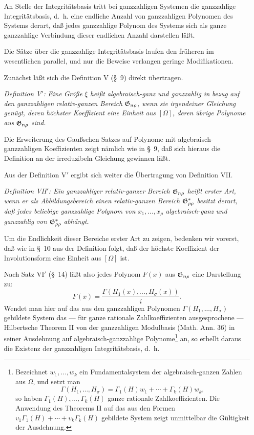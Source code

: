 An Stelle der Integritätsbasis tritt bei ganzzahligen Systemen die ganzzahlige Integritätsbasis, d.~h. eine endliche Anzahl von ganzzahligen Polynomen des Systems derart, daß jedes ganzzahlige Polynom des Systems sich als ganze ganzzahlige Verbindung dieser endlichen Anzahl darstellen läßt.

Die Sätze über die ganzzahlige Integritätsbasis laufen den früheren im wesentlichen parallel, und nur die Beweise verlangen geringe Modifikationen.

Zunächst läßt sich die Definition V (\S\ 9) direkt übertragen.

\emph{Definition V$'$: Eine Größe $\xi$ heißt algebraisch-ganz und ganzzahlig in bezug auf den ganzzahligen relativ-ganzen Bereich $\mathfrak{G}_{n\rho}$, wenn sie irgendeiner Gleichung genügt, deren höchster Koeffizient eine Einheit aus $[\Omega]$, deren übrige Polynome aus $\mathfrak{G}_{n\rho}$ sind.}

Die Erweiterung des Gaußschen Satzes auf Polynome mit algebraisch-ganzzahligen Koeffizienten zeigt nämlich wie in \S\ 9, daß sich hieraus die Definition an der irreduzibeln Gleichung gewinnen läßt.

Aus der Definition V$'$ ergibt sich weiter die Übertragung von Definition VII.

\emph{Definition VII$'$: Ein ganzzahliger relativ-ganzer Bereich $\mathfrak{G}_{n\rho}$ heißt erster Art, wenn er als Abbildungsbereich einen relativ-ganzen Bereich $\mathfrak{G}^*_{\rho\rho}$ besitzt derart, daß jedes beliebige ganzzahlige Polynom von $x_1,
\ldots,x_\rho$ algebraisch-ganz und ganzzahlig von $\mathfrak{G}^*_{\rho\rho}$ abhängt.}

Um die Endlichkeit dieser Bereiche erster Art zu zeigen, bedenken wir vorerst, daß wie in \S\ 10 aus der Definition folgt, daß der höchste Koeffizient der Involutionsform eine Einheit aus $[\Omega]$ ist.

Nach Satz VI$'$ (\S\ 14) läßt also jedes Polynom $F(x)$ aus $\mathfrak{G}_{n\rho}$ eine Darstellung zu:
\[
  F(x)=\frac{\Gamma(H_1(x),\ldots,H_\sigma(x))}{i}.
\]
Wendet man hier auf das aus den ganzzahligen Polynomen $\Gamma(H_1,
\ldots,H_\sigma)$ gebildete System das --- für ganze rationale Zahlkoeffizienten ausgesprochene --- Hilbertsche Theorem II von der ganzzahligen Modulbasis (Math. Ann. 36) in seiner Ausdehnung auf algebraisch-ganzzahlige Polynome\footnote{Bezeichnet $w_1,
\ldots,w_k$ ein Fundamentalsystem der algebraisch-ganzen Zahlen aus $\Omega$, und setzt man
\[
  \Gamma(H_1,
\ldots,H_\sigma)=\Gamma_1(H)w_1+\cdots+\Gamma_k(H)w_k,
\]
so haben $\Gamma_1(H),
\ldots,\Gamma_k(H)$ ganze rationale Zahlkoeffizienten. Die Anwendung des Theorems II auf das aus den Formen $v_1\Gamma_1(H)+\cdots+v_k\Gamma_k(H)$ gebildete System zeigt unmittelbar die Gültigkeit der Ausdehnung.} an, so erhellt daraus die Existenz der ganzzahligen Integritätsbasis, d.~h.

